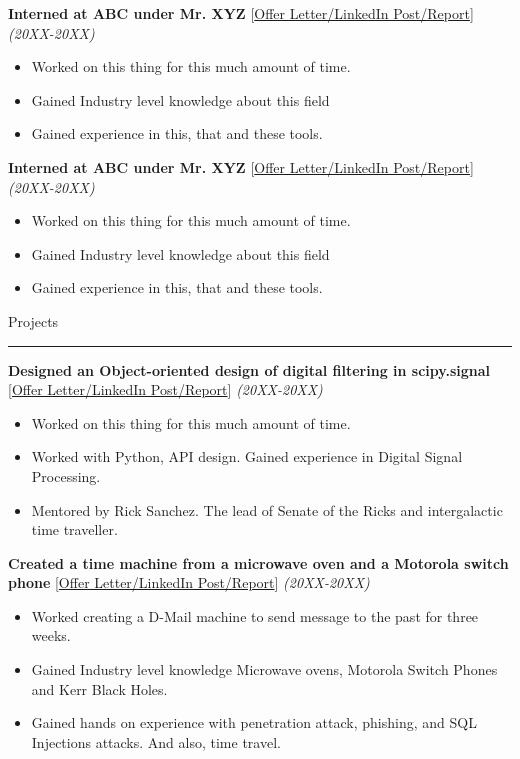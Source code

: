 \documentclass[10pt, hidelinks]{article}
\begin{document}
	{\normalsize\textbf{Interned at ABC under Mr. XYZ}} {\small[\href{https://httpbin.com}{Offer Letter/LinkedIn Post/Report}]} \hspace*{8pt} {\normalsize\textit{(20XX-20XX)}}
	{\vspace*{-3mm}
	\begin{itemize}
		\itemsep-0.3em
		\item Worked on this thing for this much amount of time.
		\item Gained Industry level knowledge about this field
		\item Gained experience in this, that and these tools.
	\end{itemize}
	}
	{\normalsize\textbf{Interned at ABC under Mr. XYZ}} {\small[\href{https://httpbin.com}{Offer Letter/LinkedIn Post/Report}]} \hspace*{8pt} {\normalsize\textit{(20XX-20XX)}}
	{\vspace*{-3mm}
	\begin{itemize}
		\itemsep-0.3em
		\item Worked on this thing for this much amount of time.
		\item Gained Industry level knowledge about this field
		\item Gained experience in this, that and these tools.
	\end{itemize}
	}


	{\large\color{RoyalBlue}Projects}
	\par\noindent\rule[7pt]{\textwidth}{0.1pt}

	{\normalsize\textbf{Designed an Object-oriented design of digital filtering in scipy.signal}} {\small[\href{https://httpbin.com}{Offer Letter/LinkedIn Post/Report}]} \hspace*{8pt} {\normalsize\textit{(20XX-20XX)}}
	{\vspace*{-3mm}
	\begin{itemize}
		\itemsep-0.3em
		\item Worked on this thing for this much amount of time.
		\item Worked with Python, API design. Gained experience in Digital Signal Processing.
		\item Mentored by Rick Sanchez. The lead of Senate of the Ricks and intergalactic time traveller.
	\end{itemize}
	}
	{\normalsize\textbf{Created a time machine from a microwave oven and a Motorola switch phone}} {\small[\href{https://httpbin.com}{Offer Letter/LinkedIn Post/Report}]} \hspace*{8pt} {\normalsize\textit{(20XX-20XX)}}
	{\vspace*{-3mm}
	\begin{itemize}
		\itemsep-0.3em
		\item Worked creating a D-Mail machine to send message to the past for three weeks.
		\item Gained Industry level knowledge Microwave ovens, Motorola Switch Phones and Kerr Black Holes.
		\item Gained hands on experience with penetration attack, phishing, and SQL Injections attacks. And also, time travel.
	\end{itemize}
	}
\end{document}
